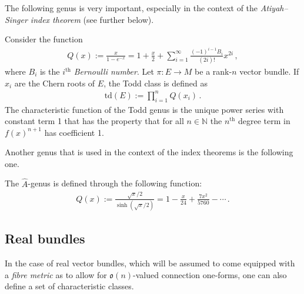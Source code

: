     The following genus is very important, especially in the context of the \textit{Atiyah--Singer index theorem} (see further below).
    \begin{example}\label{bundle:todd_class}
        Consider the function
        \begin{gather}
            Q(x) := \frac{x}{1-e^{-x}} = 1 + \frac{x}{2} + \sum_{i=1}^\infty\frac{(-1)^{i-1}B_i}{(2i)!}x^{2i}\,,
        \end{gather}
        where $B_i$ is the $i^{\text{th}}$ \textit{Bernoulli number}. Let $\pi:E\rightarrow M$ be a rank-$n$ vector bundle. If $x_i$ are the Chern roots of $E$, the Todd class is defined as
        \begin{gather}
            \mathrm{td}(E) := \prod_{i=1}^nQ(x_i)\,.
        \end{gather}
        The characteristic function of the Todd genus is the unique power series with constant term 1 that has the property that for all $n\in\mathbb{N}$ the $n^{\text{th}}$ degree term in $f(x)^{n+1}$ has coefficient 1.
    \end{example}
    Another genus that is used in the context of the index theorems is the following one.
    \begin{example}\label{bundle:a_roof_genus}
        The $\hat{A}$-genus is defined through the following function:
        \begin{gather}
            Q(x) := \frac{\sqrt{x}/2}{\sinh(\sqrt{x}/2)} = 1 - \frac{x}{24} + \frac{7x^2}{5760} - \cdots\,.
        \end{gather}
    \end{example}

\subsection{Real bundles}

    In the case of real vector bundles, which will be assumed to come equipped with a \textit{fibre metric} as to allow for $\mathfrak{o}(n)$-valued connection one-forms, one can also define a set of characteristic classes.


